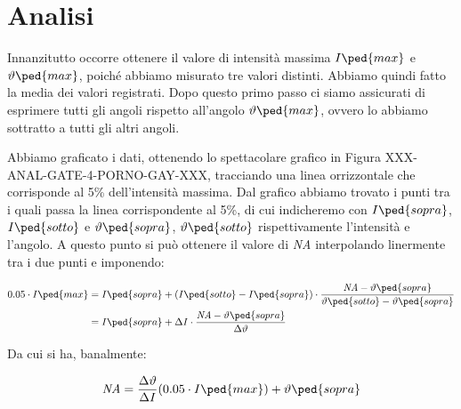 \section{Analisi}

Innanzitutto occorre ottenere il valore di intensità massima $I\ped{max}$ e $\vartheta\ped{max}$, poiché abbiamo misurato tre valori distinti.
Abbiamo quindi fatto la media dei valori registrati. Dopo questo primo passo ci siamo assicurati di esprimere tutti gli angoli rispetto
all'angolo $\vartheta\ped{max}$, ovvero lo abbiamo sottratto a tutti gli altri angoli.

Abbiamo graficato i dati, ottenendo lo spettacolare grafico in Figura XXX-ANAL-GATE-4-PORNO-GAY-XXX, tracciando una linea orrizzontale
che corrisponde al 5\% dell'intensità massima. Dal grafico abbiamo trovato i punti tra i quali passa la linea corrispondente al 5\%,
di cui indicheremo con $I\ped{sopra}$, $I\ped{sotto}$ e $\vartheta\ped{sopra}$, $\vartheta\ped{sotto}$ rispettivamente l'intensità e l'angolo.
A questo punto si può ottenere il valore di \emph{NA} interpolando linermente tra i due punti e imponendo:

\begin{equation}
    \begin{split}
        0.05 \cdot I\ped{max} &= I\ped{sopra} + (I\ped{sotto} - I\ped{sopra}) \cdot \frac{\emph{NA} - \vartheta\ped{sopra}}{\vartheta\ped{sotto} - \vartheta\ped{sopra}} \\
                              &= I\ped{sopra} + \Delta I \cdot \frac{\emph{NA} - \vartheta\ped{sopra}}{\Delta \vartheta}
    \end{split}
\end{equation}

Da cui si ha, banalmente:

\begin{equation}
    \emph{NA} = \frac{\Delta \vartheta}{\Delta I} (0.05 \cdot I\ped{max}) + \vartheta\ped{sopra}
\end{equation}



